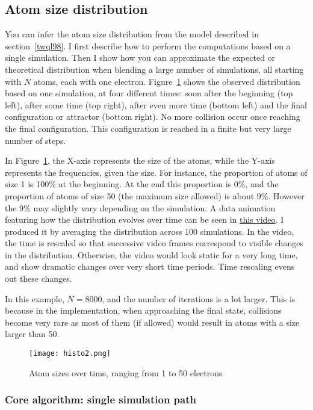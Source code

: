 \documentclass[oneside,10pt]{book}
\begin{document}
\subsection{Atom size distribution}

You can infer the atom size distribution from the model described in section~\ref{twql98}. I first describe how to perform the computations based on a single simulation. Then I show how you can approximate the expected or theoretical distribution when blending a large number of simulations, all starting with $N$ atoms, each with one electron. Figure~\ref{twql9809} shows the observed distribution based on one simulation, at four different times: soon after the beginning (top left), after some time (top right), after even more time (bottom left) and the final configuration or attractor (bottom right). No more collision occur once reaching the final configuration. This configuration is reached in a finite but very large number of steps.

In Figure~\ref{twql9809}, the X-axis represents the size of the atoms, while the Y-axis represents the frequencies, given the size. For instance, the proportion of atoms of size 1 is 100\% at the beginning. At the end this proportion is 0\%, and the proportion of atoms of size 50 (the maximum size allowed) is about 9\%. However the 9\% may slightly vary depending on the simulation. A data animation featuring how the distribution evolves over time can be seen in
\href{https://youtu.be/MUvoO9YmfgY}{this video}. I produced it by averaging the distribution across 100 simulations.
In the video, the time is rescaled so that successive video frames correspond to visible changes in the distribution. Otherwise, the video would look static for a very long time, and show dramatic changes over very short time periods. Time rescaling evens out these changes.

In this example, $N=8000$, and the number of iterations is a lot larger. This is because in the implementation, when approaching the final state, collisions become very rare as most of them (if allowed) would result in atoms with a size larger than 50.

\begin{figure}[H]
\centering
\texttt{[image: histo2.png]}
\caption{Atom sizes over time, ranging from 1 to 50 electrons}
\label{twql9809}
\end{figure}


\subsubsection{Core algorithm: single simulation path}
\end{document}
